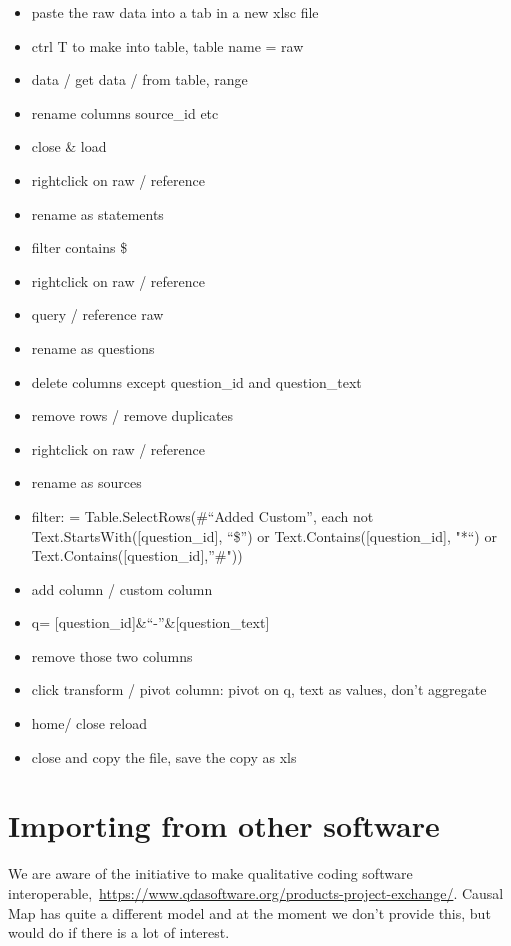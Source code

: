 \documentclass[
]{book}
\providecommand{\tightlist}{%
  \setlength{\itemsep}{0pt}\setlength{\parskip}{0pt}}
\begin{document}
\begin{itemize}
\tightlist
\item
  paste the raw data into a tab in a new xlsc file
\item
  ctrl T to make into table, table name = raw
\item
  data / get data / from table, range
\item
  rename columns source\_id etc
\item
  close \& load
\item
  rightclick on raw / reference
\item
  rename as statements
\item
  filter contains \$
\item
  rightclick on raw / reference
\item
  query / reference raw
\item
  rename as questions
\item
  delete columns except question\_id and question\_text
\item
  remove rows / remove duplicates
\item
  rightclick on raw / reference
\item
  rename as sources
\item
  filter: = Table.SelectRows(\#``Added Custom'', each not Text.StartsWith({[}question\_id{]}, ``\$'') or Text.Contains({[}question\_id{]}, "*``) or Text.Contains({[}question\_id{]},''\#"))
\item
  add column / custom column
\item
  q= {[}question\_id{]}\&``-''\&{[}question\_text{]}
\item
  remove those two columns
\item
  click transform / pivot column: pivot on q, text as values, don't aggregate
\item
  home/ close reload
\item
  close and copy the file, save the copy as xls
\end{itemize}

\hypertarget{importing-from-other-software-1}{%
\section{Importing from other software}\label{importing-from-other-software-1}}

We are aware of the initiative to make qualitative coding software interoperable,~\url{https://www.qdasoftware.org/products-project-exchange/}. Causal Map has quite a different model and at the moment we don't provide this, but would do if there is a lot of interest.
\end{document}
